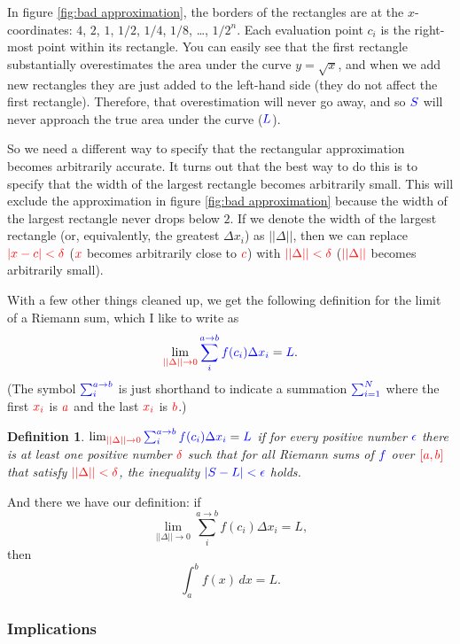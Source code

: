 \documentclass{myarticle}
\newcommand{\hor}[1]{\textcolor{red}{#1}} %
\newcommand{\ver}[1]{\textcolor{blue}{#1}}
\theoremstyle{nospace}
\newtheorem*{oldattempt}{Definition}
\newenvironment{attempt}{\begin{mdframed}\begin{oldattempt}}{\end{oldattempt}\end{mdframed}}
\newtheorem{old series theorem}{Theorem}
\newenvironment{series theorem}{\begin{mdframed}\begin{old series theorem}}{\end{old series theorem}\end{mdframed}}
\begin{document}
In figure \ref{fig:bad approximation}, the borders of the rectangles are at the $x$-coordinates: $4$, $2$, $1$, $1/2$, $1/4$, $1/8$, \ldots, $1/2^n$. Each evaluation point $c_i$ is the right-most point within its rectangle. You can easily see that the first rectangle substantially overestimates the area under the curve $y = \sqrt{x}$, and when we add new rectangles they are just added to the left-hand side (they do not affect the first rectangle). Therefore, that overestimation will never go away, and so $\ver{S}$ will never approach the true area under the curve ($\ver{L}$).

So we need a different way to specify that the rectangular approximation becomes arbitrarily accurate. It turns out that the best way to do this is to specify that the width of the largest rectangle becomes arbitrarily small. This will exclude the approximation in figure \ref{fig:bad approximation} because the width of the largest rectangle never drops below $2$. If we denote the width of the largest rectangle (or, equivalently, the greatest $\Delta x_i$) as $||\Delta||$, then we can replace $\hor{|x - c| < \delta}$ ($\hor{x}$ becomes arbitrarily close to $\hor{c}$) with $\hor{||\Delta|| < \delta}$ ($\hor{||\Delta||}$ becomes arbitrarily small).

With a few other things cleaned up, we get the following definition for the limit of a Riemann sum, which I like to write as \[ \lim_{\hor{||\Delta|| \to 0}} \ver{\sum_i^{a \to b} f(c_i) \Delta x_i} = \ver{L}. \] (The symbol $\ver{\sum_i^{a \to b}}$ is just shorthand to indicate a summation $\ver{\sum_{i=1}^N}$ where the first $\hor{x_i}$ is $\hor{a}$ and the last $\hor{x_i}$ is $\hor{b}$.)

\begin{attempt} $\lim_{\hor{||\Delta|| \to 0}} \ver{\sum_i^{a \to b} f(c_i) \Delta x_i} = \ver{L}$ if for every positive number $\ver{\epsilon}$ there is at least one positive number $\hor{\delta}$ such that for all Riemann sums of $\ver{f}$ over $\hor{[a, b]}$ that satisfy $\hor{||\Delta|| < \delta}$, the inequality $\ver{|S - L| < \epsilon}$ holds. \end{attempt}

And there we have our definition: if \[ \lim_{||\Delta|| \to 0} \sum_i^{a \to b} f(c_i) \Delta x_i = L, \] then \[ \int_a^b f(x) \,dx = L. \]

\subsubsection{Implications} \label{sec:integral definition implications}
\end{document}

